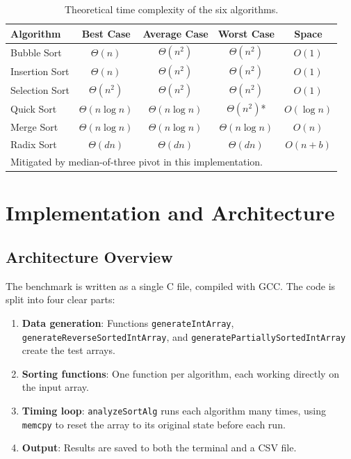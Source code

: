 \documentclass[12pt,a4paper]{article}
\theoremstyle{definition}
\begin{document}
\begin{table}[H]
\centering
\caption{Theoretical time complexity of the six algorithms.}
\label{tab:complexity}
\begin{tabular}{lcccc}
\toprule
\textbf{Algorithm} & \textbf{Best Case} & \textbf{Average Case} & \textbf{Worst Case} & \textbf{Space} \\
\midrule
Bubble Sort      & $\Theta(n)$        & $\Theta(n^2)$         & $\Theta(n^2)$       & $O(1)$ \\
Insertion Sort   & $\Theta(n)$        & $\Theta(n^2)$         & $\Theta(n^2)$       & $O(1)$ \\
Selection Sort   & $\Theta(n^2)$      & $\Theta(n^2)$         & $\Theta(n^2)$       & $O(1)$ \\
Quick Sort       & $\Theta(n \log n)$ & $\Theta(n \log n)$    & $\Theta(n^2)$*      & $O(\log n)$ \\
Merge Sort       & $\Theta(n \log n)$ & $\Theta(n \log n)$    & $\Theta(n \log n)$  & $O(n)$ \\
Radix Sort       & $\Theta(dn)$       & $\Theta(dn)$          & $\Theta(dn)$        & $O(n+b)$ \\
\bottomrule
\multicolumn{5}{l}{\footnotesize *Mitigated by median-of-three pivot in this implementation.}
\end{tabular}
\end{table}

\section{Implementation and Architecture}
\label{sec:implementation}

\subsection{Architecture Overview}

The benchmark is written as a single C file, compiled with GCC. The code is split into four clear parts:

\begin{enumerate}[label=\arabic*.]
  \item \textbf{Data generation}: Functions \texttt{generateIntArray}, \texttt{generateReverseSortedIntArray}, and \texttt{generatePartiallySortedIntArray} create the test arrays.
  \item \textbf{Sorting functions}: One function per algorithm, each working directly on the input array.
  \item \textbf{Timing loop}: \texttt{analyzeSortAlg} runs each algorithm many times, using \texttt{memcpy} to reset the array to its original state before each run.
  \item \textbf{Output}: Results are saved to both the terminal and a CSV file.
\end{enumerate}
\end{document}

